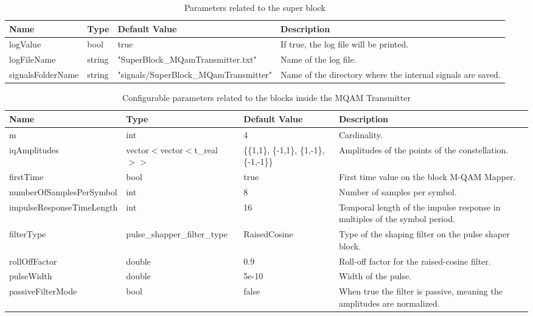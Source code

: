 \begin{table}[H]
\centering
\begin{tabular}{|l|l|l|p{2cm}|}
\hline
\textbf{Name}       & \textbf{Type} & \textbf{Default Value}                & \textbf{Description} \\ \hline
logValue            & bool          & true                                  & If true, the log file will be printed. \\ \hline
logFileName         & string        &  "SuperBlock\_MQamTransmitter.txt"     & Name of the log file. \\ \hline
signalsFolderName   & string        & "signals/SuperBlock\_MQamTransmitter"         & Name of the directory where the internal signals are saved.\\ \hline
\end{tabular}
\caption{Parameters related to the super block}
\end{table}
\begin{table}[H]
\centering
\begin{tabular}{|l|l|p{2.2cm}|p{2.5cm}|}
\hline
\textbf{Name}       & \textbf{Type} & \textbf{Default Value}                & \textbf{Description} \\ \hline
 m & int & 4 & Cardinality.\\ \hline
 iqAmplitudes & vector$<$vector$<$t\_real$>>$ & \{\{1,1\},
  \{-1,1\},
  \{1,-1\},
  \{-1,-1\}\} & Amplitudes of the points of the constellation.\\ \hline
 firstTime & bool & true & First time value on the block M-QAM Mapper. \\ \hline
 numberOfSamplesPerSymbol & int & 8 & Number of samples per symbol.\\ \hline
 impulseResponseTimeLength & int & 16 & Temporal length of the impulse response in multiples of the symbol period. \\ \hline
 filterType & pulse\_shapper\_filter\_type & RaisedCosine & Type of the shaping filter on the pulse shaper block. \\ \hline
 rollOffFactor & double & 0.9 & Roll-off factor for the raised-cosine filter.\\ \hline
 pulseWidth & double & 5e-10 & Width of the pulse.\\ \hline
 passiveFilterMode & bool & false & When true the filter is passive, meaning the amplitudes are normalized.\\ \hline
\end{tabular}
\caption{Configurable parameters related to the blocks inside the MQAM Transmitter}
\end{table}

